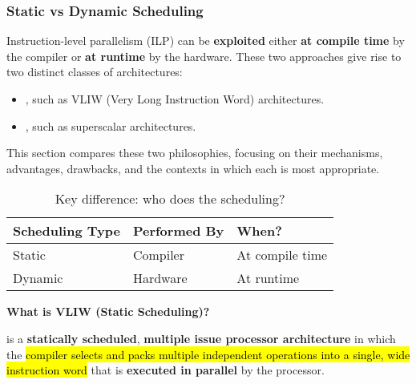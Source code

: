 \subsubsection{Static vs Dynamic Scheduling}

Instruction-level parallelism (ILP) can be \textbf{exploited} either \textbf{at compile time} by the compiler or \textbf{at runtime} by the hardware. These two approaches give rise to two distinct classes of architectures:
\begin{itemize}
    \item {}, such as VLIW (Very Long Instruction Word) architectures.
    \item {}, such as superscalar architectures.
\end{itemize}
This section compares these two philosophies, focusing on their mechanisms, advantages, drawbacks, and the contexts in which each is most appropriate.

\begin{table}[!htp]
    \centering
    \begin{tabular}{@{} l | l | l @{}}
        \toprule
        \textbf{Scheduling Type} & \textbf{Performed By} & \textbf{When?} \\
        \midrule
        Static  & Compiler & At compile time \\ [.3em]
        Dynamic & Hardware & At runtime \\
        \bottomrule
    \end{tabular}
    \caption{Key difference: who does the scheduling?}
\end{table}

\highspace
\begin{flushleft}
    \textcolor{Green3}{ \textbf{What is VLIW (Static Scheduling)?}}
\end{flushleft}
 is a \textbf{statically scheduled}, \textbf{multiple issue processor architecture} in which the \hl{compiler selects and packs multiple independent operations into a single, wide instruction word} that is \textbf{executed in parallel} by the processor.

